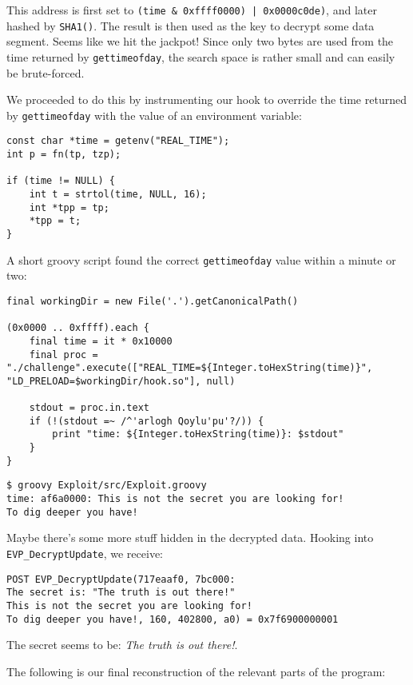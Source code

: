 \documentclass[a4paper,10pt]{article}
\begin{document}
This address is first set to \lstinline_(time & 0xffff0000) | 0x0000c0de)_, and later
hashed by \lstinline|SHA1()|. The result is then used as the key to decrypt some data segment.
Seems like we hit the jackpot! Since only two bytes are used from the time returned by 
\lstinline|gettimeofday|, the search space is rather small and can easily be brute-forced.

We proceeded to do this by instrumenting our hook to override the time returned by \lstinline|gettimeofday| with the value of an environment variable:

\begin{lstlisting}
const char *time = getenv("REAL_TIME");
int p = fn(tp, tzp);

if (time != NULL) {
    int t = strtol(time, NULL, 16);
    int *tpp = tp;
    *tpp = t;
}
\end{lstlisting}

A short groovy script found the correct \lstinline|gettimeofday| value within a minute or two:

\begin{lstlisting}
final workingDir = new File('.').getCanonicalPath()

(0x0000 .. 0xffff).each {
    final time = it * 0x10000
    final proc = "./challenge".execute(["REAL_TIME=${Integer.toHexString(time)}", "LD_PRELOAD=$workingDir/hook.so"], null)

    stdout = proc.in.text
    if (!(stdout =~ /^'arlogh Qoylu'pu'?/)) {
        print "time: ${Integer.toHexString(time)}: $stdout"
    }
}
\end{lstlisting}

\begin{verbatim}
$ groovy Exploit/src/Exploit.groovy 
time: af6a0000: This is not the secret you are looking for!
To dig deeper you have!
\end{verbatim}

Maybe there's some more stuff hidden in the decrypted data. Hooking into \lstinline|EVP_DecryptUpdate|,
we receive:

\begin{verbatim}
POST EVP_DecryptUpdate(717eaaf0, 7bc000: 
The secret is: "The truth is out there!"
This is not the secret you are looking for!
To dig deeper you have!, 160, 402800, a0) = 0x7f6900000001
\end{verbatim}

The secret seems to be: \emph{The truth is out there!}.

The following is our final reconstruction of the relevant parts of the program:
\end{document}

